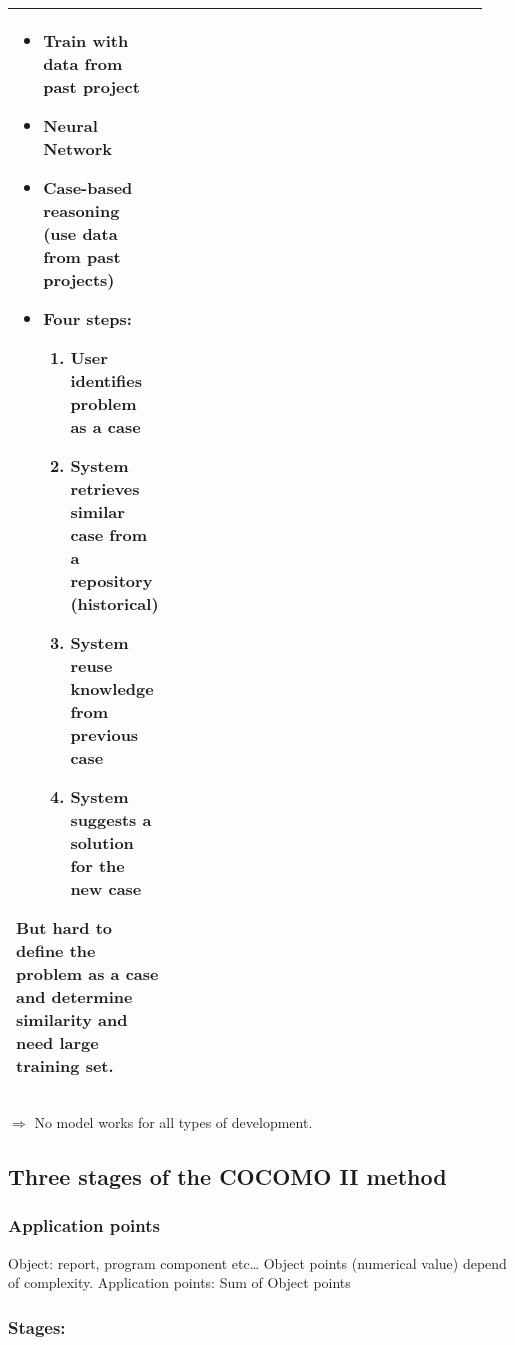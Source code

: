 \begin{table}[!ht]
\begin{tabular}{p{0.19\linewidth}|p{0.75\linewidth}}
\begin{minipage}{\linewidth}
\begin{itemize}
        					\item Train with data from past project
        					\item Neural Network
                                \item Case-based reasoning (use data from past projects)
                                \item Four steps:
                                    \begin{enumerate}
                                        \item User identifies problem as a case
                                        \item System retrieves similar case from a
                                            repository (historical)
                                        \item System reuse knowledge from previous
                                        case
                                        \item System suggests a solution for the
                                        new case
                                    \end{enumerate}
                            \end{itemize}
                            But hard to define the problem as a case and
                        determine similarity and need large training
                    set.\end{minipage} \\
        \bottomrule
    \end{tabular}
\end{table}

$\Rightarrow$  No model works for all types of development.

\FloatBarrier

\subsection{Three stages of the COCOMO II method}

\subsubsection{Application points}

Object: report, program component etc\ldots
Object points (numerical value) depend of complexity.
Application points: Sum of Object points

\subsubsection{Stages:}

